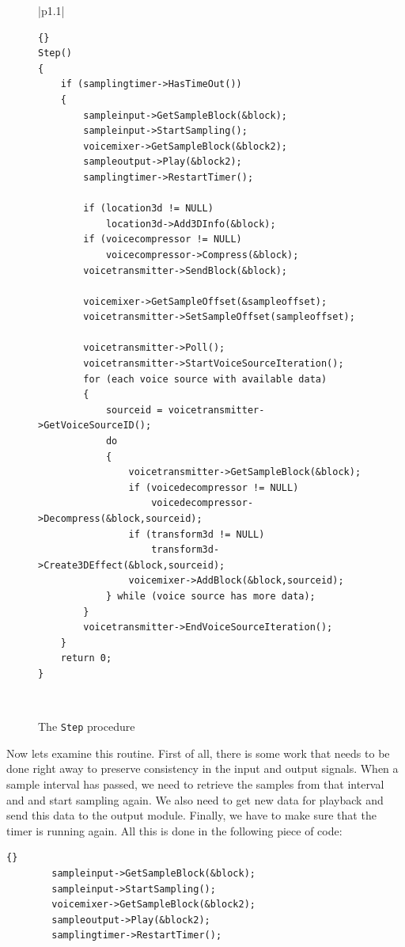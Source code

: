 		\begin{figure}
			\begin{tabular}{|p{1.1\linewidth}|}
				\hline
				\begin{minipage}{0.95\linewidth}
				\begin{lstlisting}{}
Step()
{
	if (samplingtimer->HasTimeOut())
	{
		sampleinput->GetSampleBlock(&block);
		sampleinput->StartSampling();
		voicemixer->GetSampleBlock(&block2);
		sampleoutput->Play(&block2);
		samplingtimer->RestartTimer();

		if (location3d != NULL)
			location3d->Add3DInfo(&block);
		if (voicecompressor != NULL)
			voicecompressor->Compress(&block);
		voicetransmitter->SendBlock(&block);

		voicemixer->GetSampleOffset(&sampleoffset);
		voicetransmitter->SetSampleOffset(sampleoffset);

		voicetransmitter->Poll();
		voicetransmitter->StartVoiceSourceIteration();
		for (each voice source with available data)
		{
			sourceid = voicetransmitter->GetVoiceSourceID();
			do
			{
				voicetransmitter->GetSampleBlock(&block);
				if (voicedecompressor != NULL)
					voicedecompressor->Decompress(&block,sourceid);
				if (transform3d != NULL)
					transform3d->Create3DEffect(&block,sourceid);
				voicemixer->AddBlock(&block,sourceid);
			} while (voice source has more data);
		}
		voicetransmitter->EndVoiceSourceIteration();
	}
	return 0;
}
				\end{lstlisting}
				\end{minipage}\\
				\hline
			\end{tabular}
			\caption{The {\tt Step} procedure}
			\label{voip-step-procedure}
		\end{figure}
		
		Now lets examine this routine. First of all, there is some work that
		needs to be done right away to preserve consistency in the input and
		output signals. When a sample interval has passed, we need to retrieve
		the samples from that interval and and start sampling again. We also
		need to get new data for playback and send this data to the output module.
		Finally, we have to make sure that the timer is running again. All this
		is done in the following piece of code:
		\begin{lstlisting}[frame=tb]{}
		sampleinput->GetSampleBlock(&block);
		sampleinput->StartSampling();
		voicemixer->GetSampleBlock(&block2);
		sampleoutput->Play(&block2);
		samplingtimer->RestartTimer();
		\end{lstlisting}
		
